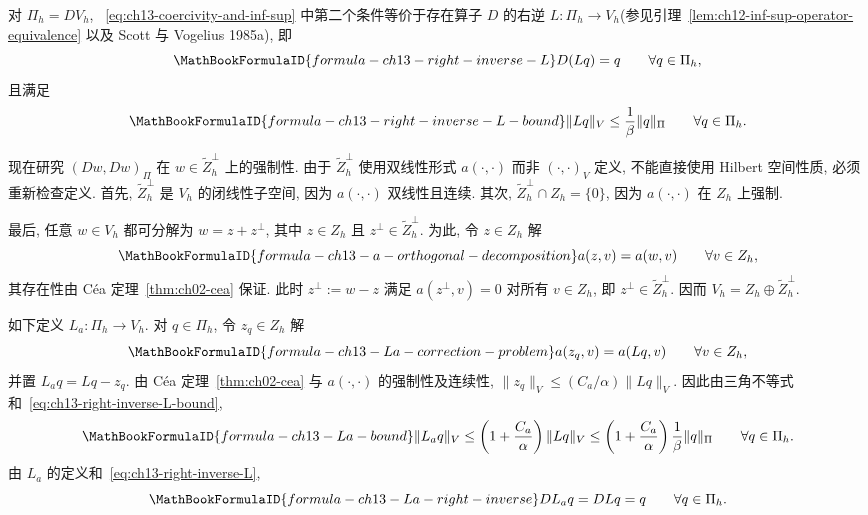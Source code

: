 对 $\Pi_h=DV_h$, ~\eqref{eq:ch13-coercivity-and-inf-sup} 中第二个条件等价于存在算子 $D$ 的右逆 $L:\Pi_h\to V_h$(参见引理~\ref{lem:ch12-inf-sup-operator-equivalence} 以及 Scott 与 Vogelius 1985a), 即
\begin{equation}
\MathBookFormulaID{formula-ch13-right-inverse-L}
\label{eq:ch13-right-inverse-L}
D(Lq)=q\qquad\forall q\in\Pi_h,
\end{equation}
且满足
\begin{equation}
\MathBookFormulaID{formula-ch13-right-inverse-L-bound}
\label{eq:ch13-right-inverse-L-bound}
\|Lq\|_V\leq\frac1\beta\|q\|_\Pi
\qquad\forall q\in\Pi_h.
\end{equation}

现在研究 $(Dw,Dw)_\Pi$ 在 $w\in\widetilde Z_h^\perp$ 上的强制性. 由于 $\widetilde Z_h^\perp$ 使用双线性形式 $a(\cdot,\cdot)$ 而非 $(\cdot,\cdot)_V$ 定义, 不能直接使用 Hilbert 空间性质, 必须重新检查定义. 首先, $\widetilde Z_h^\perp$ 是 $V_h$ 的闭线性子空间, 因为 $a(\cdot,\cdot)$ 双线性且连续. 其次, $\widetilde Z_h^\perp\cap Z_h=\{0\}$, 因为 $a(\cdot,\cdot)$ 在 $Z_h$ 上强制.

最后, 任意 $w\in V_h$ 都可分解为 $w=z+z^\perp$, 其中 $z\in Z_h$ 且 $z^\perp\in\widetilde Z_h^\perp$. 为此, 令 $z\in Z_h$ 解
\[
\MathBookFormulaID{formula-ch13-a-orthogonal-decomposition}
a(z,v)=a(w,v)\qquad\forall v\in Z_h,
\]
其存在性由 Céa 定理~\ref{thm:ch02-cea} 保证. 此时 $z^\perp:=w-z$ 满足 $a(z^\perp,v)=0$ 对所有 $v\in Z_h$, 即 $z^\perp\in\widetilde Z_h^\perp$. 因而 $V_h=Z_h\oplus\widetilde Z_h^\perp$.

如下定义 $L_a:\Pi_h\to V_h$. 对 $q\in\Pi_h$, 令 $z_q\in Z_h$ 解
\[
\MathBookFormulaID{formula-ch13-La-correction-problem}
a(z_q,v)=a(Lq,v)\qquad\forall v\in Z_h,
\]
并置 $L_aq=Lq-z_q$. 由 Céa 定理~\ref{thm:ch02-cea} 与 $a(\cdot,\cdot)$ 的强制性及连续性,
$\|z_q\|_V\leq(C_a/\alpha)\|Lq\|_V$. 因此由三角不等式和~\eqref{eq:ch13-right-inverse-L-bound},
\begin{equation}
\MathBookFormulaID{formula-ch13-La-bound}
\label{eq:ch13-La-bound}
\|L_aq\|_V
\leq\left(1+\frac{C_a}{\alpha}\right)\|Lq\|_V
\leq\left(1+\frac{C_a}{\alpha}\right)\frac1\beta\|q\|_\Pi
\qquad\forall q\in\Pi_h.
\end{equation}
由 $L_a$ 的定义和~\eqref{eq:ch13-right-inverse-L},
\begin{equation}
\MathBookFormulaID{formula-ch13-La-right-inverse}
\label{eq:ch13-La-right-inverse}
DL_aq=DLq=q\qquad\forall q\in\Pi_h.
\end{equation}

